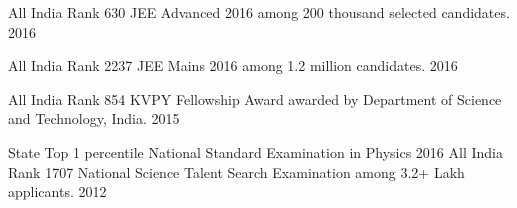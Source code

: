 \begin{cvhonors}
  \cvhonor
		{All India Rank 630}
		{JEE Advanced 2016 among 200 thousand selected candidates.}
  {}
  {2016}

  \cvhonor
  {All India Rank 2237}
{JEE Mains 2016 among 1.2 million candidates.}
  {}
  {2016}

  \cvhonor
  {All India Rank 854}
  {KVPY Fellowship Award awarded by Department of Science and Technology, India.}
  {}
  {2015}

	\cvhonor
		{State Top 1 percentile}{
				National Standard Examination in Physics
				}{}{2016}
	\cvhonor
  {All India Rank 1707}
  {National Science Talent Search Examination among 3.2+ Lakh applicants.}
  {}
  {2012}

\end{cvhonors}

